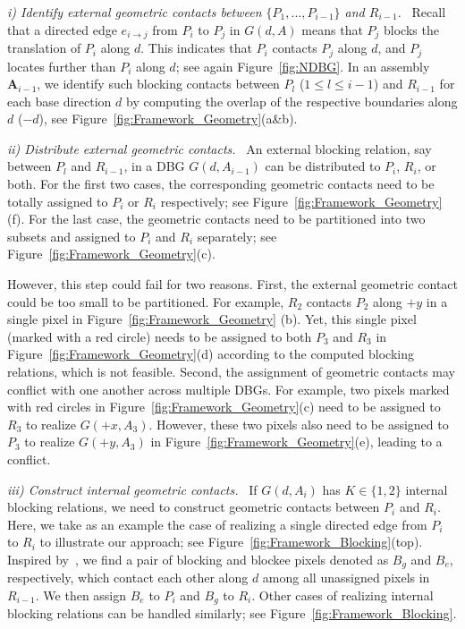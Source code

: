 \vspace*{1.0mm}
\noindent
{\em i) Identify external geometric contacts between $\{P_1, ..., P_{i-1}\}$ and $R_{i-1}$. } \
Recall that a directed edge $e_{i \rightarrow j}$ from $P_i$ to $P_j$ in $G(d, A)$ means that $P_j$ blocks the translation of $P_i$ along $d$.
This indicates that $P_i$ contacts $P_j$ along $d$, and $P_j$ locates further than $P_i$ along $d$; see again Figure~\ref{fig:NDBG}.
In an assembly $\mathbf{A}_{i-1}$, we identify such blocking contacts between $P_l$ ($1\leq l\leq{i-1}$) and $R_{i-1}$ for each base direction $d$ by computing the overlap of the respective boundaries along $d$ ($-d$), see Figure~\ref{fig:Framework_Geometry}(a\&b).



\vspace*{1.0mm}
\noindent
{\em ii) Distribute external geometric contacts. } \
An external blocking relation, say between $P_l$ and $R_{i-1}$,  in a DBG $G(d, A_{i-1})$ can be distributed to $P_i$, $R_i$, or both.
For the first two cases, the corresponding geometric contacts need to be totally assigned to $P_i$ or $R_i$ respectively; see Figure~\ref{fig:Framework_Geometry}(f).
For the last case, the geometric contacts need to be partitioned into two subsets and assigned to $P_i$ and $R_i$ separately; see Figure~\ref{fig:Framework_Geometry}(c).

However, this step could fail for two reasons.
First, the external geometric contact could be too small to be partitioned.
For example, $R_2$ contacts $P_2$ along $+y$ in a single pixel in Figure~\ref{fig:Framework_Geometry} (b).
Yet, this single pixel (marked with a red circle) needs to be assigned to both $P_3$ and $R_3$ in Figure~\ref{fig:Framework_Geometry}(d) according to the computed blocking relations, which is not feasible.
Second, the assignment of geometric contacts may conflict with one another across multiple DBGs.
For example, two pixels marked with red circles in Figure~\ref{fig:Framework_Geometry}(c) need to be assigned to $R_3$ to realize $G(+x, A_3)$.
However, these two pixels also need to be assigned to $P_3$ to realize $G(+y, A_3)$ in Figure~\ref{fig:Framework_Geometry}(e), leading to a conflict. 
 
\vspace*{1.0mm}
\noindent
{\em iii) Construct internal geometric contacts. } \
If $G(d, A_i)$ has $K\in \{1, 2\}$ internal blocking relations, we need to construct geometric contacts between $P_i$ and $R_i$.
Here, we take as an example the case of realizing a single directed edge from $P_i$ to $R_i$ to illustrate our approach; see Figure~\ref{fig:Framework_Blocking}(top).
Inspired by~\cite{Song-2012-InterCubes}, we find a pair of blocking and blockee pixels denoted as $B_g$ and $B_e$, respectively, which contact each other along $d$ among all unassigned pixels in $R_{i-1}$.
We then assign $B_e$ to $P_i$ and $B_g$ to $R_i$.
Other cases of realizing internal blocking relations can be handled similarly; see Figure~\ref{fig:Framework_Blocking}.

